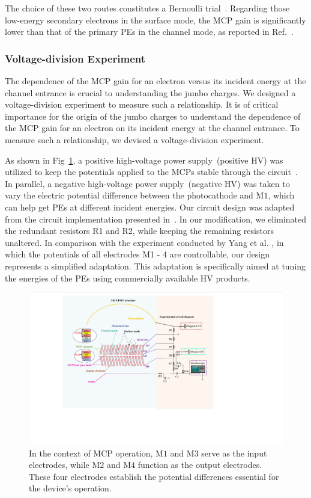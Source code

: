 The choice of these two routes constitutes a Bernoulli trial~\cite{1955Scintillation}. Regarding those low-energy secondary electrons in the surface mode, the MCP gain is significantly lower than that of the primary PEs in the channel mode, as reported in Ref.~\cite{2012An}.

\subsubsection{Voltage-division Experiment}\label{sec:gain}
The dependence of the MCP gain for an electron versus its incident energy at the
channel entrance is crucial to understanding the jumbo charges.
We designed a voltage-division experiment to measure such a relationship.
It is of critical importance for the origin of the jumbo charges to understand the dependence of the MCP gain for an electron on its incident energy at the channel entrance. To measure such a relationship, we devised a voltage-division experiment.

As shown in Fig~\ref{fig:circuit},  a positive high-voltage power supply~(positive HV) was utilized to keep the potentials applied
to the MCPs stable through the circuit~\cite{Luo:2023jdf}.  In parallel, a negative high-voltage power supply~(negative HV) was taken to vary the electric
potential difference between the photocathode and $\mathrm{M}1$, which can help get PEs at different incident energies.
Our circuit design was adapted from the circuit implementation presented in~\cite{Luo:2023jdf}. In our modification, we eliminated the redundant resistors R1 and R2, while keeping the remaining resistors unaltered.
In comparison with the experiment conducted by Yang et al. \cite{2017MCP}, in which the potentials of all electrodes M1 - 4 are controllable, our design represents a simplified adaptation. This adaptation is specifically aimed at tuning the energies of the PEs using commercially available HV products.

\begin{figure}[!ht]
	\centering
	\includegraphics[width=\linewidth]{PMTRelated/GTmodel/set.pdf}
	\caption{
		In the context of MCP operation, $\mathrm{M}1$ and $\mathrm{M}3$ serve as the input electrodes, while $\mathrm{M}2$ and $\mathrm{M}4$ function as the output electrodes. These four electrodes establish the potential differences essential for the device's operation. }
	\label{fig:circuit}
\end{figure}

